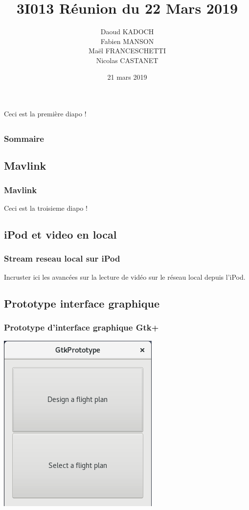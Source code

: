 \documentclass{beamer}
\title{3I013 Réunion du 22 Mars 2019}
\author{Daoud KADOCH\\Fabien MANSON\\Maël FRANCESCHETTI\\Nicolas CASTANET\\}
\begin{document}
	\begin{frame}
		\begin{center}
		\date{21 mars 2019}
		\maketitle
		Ceci est la première diapo !\\
		\end{center}
	\end{frame}
	
	
	
	\begin{frame}
		\section{}
		\begin{flushleft}
		\frametitle{Sommaire}
		\tableofcontents{}
		\end{flushleft}
	\end{frame}
	
	
	\begin{frame}
	\section{Mavlink}
		\begin{center}
		\frametitle{Mavlink}
		Ceci est la troisieme diapo !\\
		\end{center}
	\end{frame}
	
	\begin{frame}
	\section{iPod et video en local}
		\begin{center}
		\frametitle{Stream reseau local sur iPod}
		Incruster ici les avancées sur la lecture de vidéo sur le réseau local depuis l'iPod.
		\end{center}	
	\end{frame}
	
	\begin{frame}
	\section{Prototype interface graphique}
		\begin{center}
		\frametitle{Prototype d'interface graphique Gtk+}
		\includegraphics[scale=0.60]{GUI_Gtk.png}
		\end{center}
	\end{frame}
	
\end{document}
